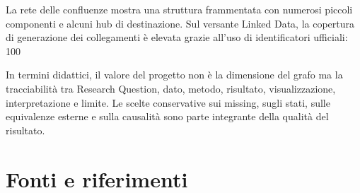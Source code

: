 \documentclass[11pt,a4paper]{article}
\begin{document}
La rete delle confluenze mostra una struttura frammentata con numerosi piccoli componenti e alcuni hub di destinazione. Sul versante Linked Data, la copertura di generazione dei collegamenti è elevata grazie all'uso di identificatori ufficiali: 100%

In termini didattici, il valore del progetto non è la dimensione del grafo ma la tracciabilità tra Research Question, dato, metodo, risultato, visualizzazione, interpretazione e limite. Le scelte conservative sui missing, sugli stati, sulle equivalenze esterne e sulla causalità sono parte integrante della qualità del risultato.

\section{Fonti e riferimenti}
\printbibliography[heading=none]
\end{document}

